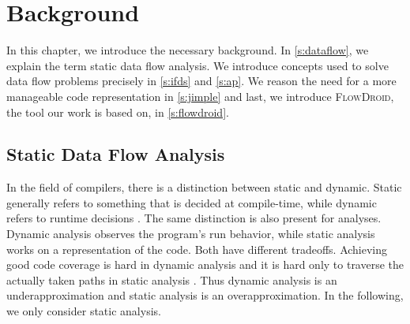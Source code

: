 \documentclass[../draft.tex]{subfiles}
\begin{document}
    \chapter{Background}
    In this chapter, we introduce the necessary background. In \autoref{s:dataflow}, we explain the term static data flow analysis. We introduce concepts used to solve data flow problems precisely in \autoref{s:ifds} and \autoref{s:ap}. We reason the need for a more manageable code representation in \autoref{s:jimple} and last, we introduce \textsc{FlowDroid}, the tool our work is based on, in \autoref{s:flowdroid}.

    \section{Static Data Flow Analysis}\label{s:dataflow}
    In the field of compilers, there is a distinction between static and dynamic. Static generally refers to something that is decided at compile-time, while dynamic refers to runtime decisions \cite{Aho1986}. 
    The same distinction is also present for analyses. Dynamic analysis observes the program's run behavior, while static analysis works on a representation of the code. Both have different tradeoffs. Achieving good code coverage is hard in dynamic analysis and it is hard only to traverse the actually taken paths in static analysis \cite{Arzt2017PhD}. Thus dynamic analysis is an underapproximation and static analysis is an overapproximation. In the following, we only consider static analysis.
\end{document}

